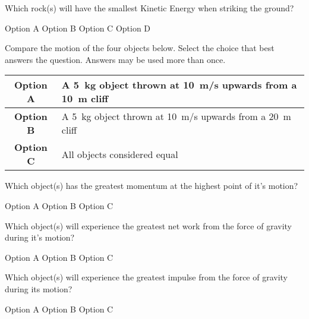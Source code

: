 \documentclass[answers,dvipsnames]{exam}
\begin{document}
\begin{questions}
\question
Which rock(s) will have the smallest Kinetic Energy when striking the ground?

\begin{randomizechoices}[norandomize]
    \choice Option A
    \choice Option B
    \correctchoice Option C
    \choice Option D
\end{randomizechoices}

\begin{EnvUplevel}
    Compare the motion of the four objects below. Select the choice that best answers the question. Answers may be used more than once. 
\end{EnvUplevel}

\begin{center}
    \begin{tabular}{|c|l|}
        \hline 
        \textbf{Option A} & A \SI{5}{kg} object thrown at \SI{10}{m/s} upwards from a \SI{10}{m} cliff\\ \hline
        \textbf{Option B} & A \SI{5}{kg} object thrown at \SI{10}{m/s} upwards from a \SI{20}{m} cliff\\ \hline
        \textbf{Option C} & All objects considered equal\\ \hline
    \end{tabular}
\end{center}

\question
Which object(s) has the greatest momentum at the highest point of it’s motion?

\begin{randomizechoices}[norandomize]
    \choice Option A
    \choice Option B
    \correctchoice Option C
\end{randomizechoices}


\question
Which object(s) will experience the greatest net work from the force of gravity during it’s motion?

\begin{randomizechoices}[norandomize]
    \choice Option A
    \correctchoice Option B
    \choice Option C
\end{randomizechoices}


\question
Which object(s) will experience the greatest impulse from the force of gravity during its motion?


\begin{randomizechoices}[norandomize]
    \choice Option A %
    \correctchoice Option B
    \choice Option C
\end{randomizechoices}




\end{questions}
\end{document}
